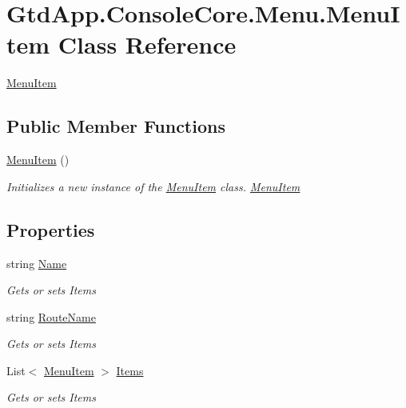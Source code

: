 \hypertarget{class_gtd_app_1_1_console_core_1_1_menu_1_1_menu_item}{}\section{Gtd\+App.\+Console\+Core.\+Menu.\+Menu\+Item Class Reference}
\label{class_gtd_app_1_1_console_core_1_1_menu_1_1_menu_item}


\mbox{\hyperlink{class_gtd_app_1_1_console_core_1_1_menu_1_1_menu_item}{Menu\+Item}}  


\subsection*{Public Member Functions}
\begin{DoxyCompactItemize}
\item 
\mbox{\hyperlink{class_gtd_app_1_1_console_core_1_1_menu_1_1_menu_item_aa41874b8e2f75eff6bd15cedb1ca9683}{Menu\+Item}} ()
\begin{DoxyCompactList}\small\item\em Initializes a new instance of the \mbox{\hyperlink{class_gtd_app_1_1_console_core_1_1_menu_1_1_menu_item}{Menu\+Item}} class. \mbox{\hyperlink{class_gtd_app_1_1_console_core_1_1_menu_1_1_menu_item}{Menu\+Item}} \end{DoxyCompactList}\end{DoxyCompactItemize}
\subsection*{Properties}
\begin{DoxyCompactItemize}
\item 
string \mbox{\hyperlink{class_gtd_app_1_1_console_core_1_1_menu_1_1_menu_item_a57deba6819044ca021f23026cff8d259}{Name}}
\begin{DoxyCompactList}\small\item\em Gets or sets Items \end{DoxyCompactList}\item 
string \mbox{\hyperlink{class_gtd_app_1_1_console_core_1_1_menu_1_1_menu_item_ae681c87533e5c00712f2b7668268f32d}{Route\+Name}}
\begin{DoxyCompactList}\small\item\em Gets or sets Items \end{DoxyCompactList}\item 
List$<$ \mbox{\hyperlink{class_gtd_app_1_1_console_core_1_1_menu_1_1_menu_item}{Menu\+Item}} $>$ \mbox{\hyperlink{class_gtd_app_1_1_console_core_1_1_menu_1_1_menu_item_ad6d341e3919294dcd9581db39060db85}{Items}}
\begin{DoxyCompactList}\small\item\em Gets or sets Items \end{DoxyCompactList}\end{DoxyCompactItemize}


